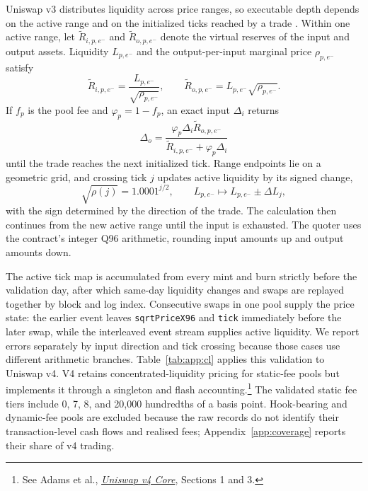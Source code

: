 Uniswap v3 distributes liquidity across price ranges, so executable depth depends on the active range and on the initialized ticks reached by a trade \citep{AdamsZinsmeisterRobinson2021UniswapV3}. Within one active range, let $\widetilde R_{i,p,e^-}$ and $\widetilde R_{o,p,e^-}$ denote the virtual reserves of the input and output assets. Liquidity $L_{p,e^-}$ and the output-per-input marginal price $\rho_{p,e^-}$ satisfy
\[
\widetilde R_{i,p,e^-}=\frac{L_{p,e^-}}{\sqrt{\rho_{p,e^-}}},
\qquad
\widetilde R_{o,p,e^-}=L_{p,e^-}\sqrt{\rho_{p,e^-}}.
\]
If $f_p$ is the pool fee and $\varphi_p=1-f_p$, an exact input $\Delta_i$ returns
\[
\Delta_o=
\frac{\varphi_p\Delta_i\widetilde R_{o,p,e^-}}
     {\widetilde R_{i,p,e^-}+\varphi_p\Delta_i}
\]
until the trade reaches the next initialized tick. Range endpoints lie on a geometric grid, and crossing tick $j$ updates active liquidity by its signed change,
\[
\sqrt{\rho(j)}=1.0001^{j/2},
\qquad L_{p,e^-}\mapsto L_{p,e^-}\pm\Delta L_j,
\]
with the sign determined by the direction of the trade. The calculation then continues from the new active range until the input is exhausted. The quoter uses the contract's integer Q96 arithmetic, rounding input amounts up and output amounts down.

The active tick map is accumulated from every mint and burn strictly before the validation day, after which same-day liquidity changes and swaps are replayed together by block and log index. Consecutive swaps in one pool supply the price state: the earlier event leaves \texttt{sqrtPriceX96} and \texttt{tick} immediately before the later swap, while the interleaved event stream supplies active liquidity. We report errors separately by input direction and tick crossing because those cases use different arithmetic branches. Table~\ref{tab:app:cl} applies this validation to Uniswap v4. V4 retains concentrated-liquidity pricing for static-fee pools but implements it through a singleton and flash accounting.\footnote{See Adams et al., \href{https://app.uniswap.org/whitepaper-v4.pdf}{\emph{Uniswap v4 Core}}, Sections 1 and 3.} The validated static fee tiers include 0, 7, 8, and 20,000 hundredths of a basis point. Hook-bearing and dynamic-fee pools are excluded because the raw records do not identify their transaction-level cash flows and realised fees; Appendix~\ref{app:coverage} reports their share of v4 trading.

